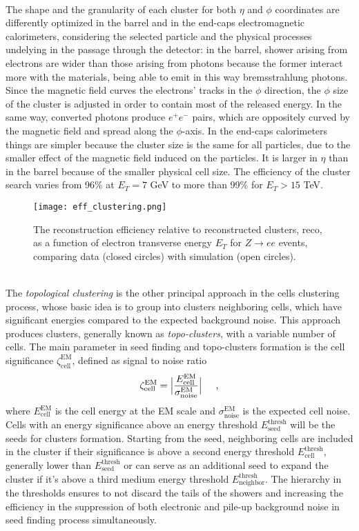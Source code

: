 \\The shape and the granularity of each cluster for both $\eta$ and $\phi$ coordinates are differently optimized in the barrel and in the end-caps electromagnetic calorimeters, considering the selected particle and the physical processes undelying in the passage through the detector: in the barrel, shower arising from electrons are wider than those arising from photons because the former interact more with the materials, being able to emit in this way bremsstrahlung photons. Since the magnetic field curves the electrons' tracks in the $\phi$ direction, the $\phi$ size of the cluster is adjusted in order to contain most of the released energy. In the same way, converted photons produce $e^+e^-$ pairs, which are oppositely curved by the magnetic field and spread along the $\phi$-axis. In the end-caps calorimeters things are simpler because the cluster size is the same for all particles, due to the smaller effect of the magnetic field induced on the particles. It is larger in $\eta$ than in the barrel because of the smaller physical cell size. The efficiency of the cluster search varies from 96\% at $E_T = 7$ GeV to more than 99\% for $E_T > 15$ TeV.
\begin{figure}[b!]
\centering
\texttt{[image: eff\_clustering.png]}
\caption{The reconstruction efficiency relative to reconstructed clusters, reco, as a function of electron transverse energy $E_T$ for $Z \rightarrow ee$ events, comparing data (closed circles) with simulation (open circles).}
\end{figure}
\\\phantom{1}\hspace{0.3cm} The \emph{topological clustering} \cite{ATL-PHYS-PUB-2017-022} is the other principal approach in the cells clustering process, whose basic idea is to group into clusters neighboring cells, which have significant energies compared to the expected background noise. This approach produces clusters, generally known as \emph{topo-clusters}, with a variable number of cells. The main parameter in seed finding and topo-clusters formation is the cell significance $\zeta_{\text{cell}}^{\text{EM}}$, defined as signal to noise ratio
\begin{equation}
\zeta_{\text{cell}}^{\text{EM}} = \Bigl|\frac{E_{\text{cell}}^{\text{EM}}}{\sigma_{\text{noise}}^{\text{EM}}}\Bigr| \hspace{0.5cm} \text{,}
\end{equation} 
where $E_{\text{cell}}^{\text{EM}}$ is the cell energy at the EM scale and $\sigma_{\text{noise}}^{\text{EM}}$ is the expected cell noise. Cells with an energy significance above an energy threshold $E_{\text{seed}}^{\text{thresh}}$ will be the seeds for clusters formation. Starting from the seed, neighboring cells are included in the cluster if their significance is above a second energy threshold $E_{\text{cell}}^{\text{thresh}}$, generally lower than $E_{\text{seed}}^{\text{thresh}}$ or can serve as an additional seed to expand the cluster if it's above a third medium energy threshold $E_{\text{neighbor}}^{\text{thresh}}$. The hierarchy in the thresholds ensures to not discard the tails of the showers and increasing the efficiency in the suppression of both electronic and pile-up background noise in seed finding process simultaneously.
